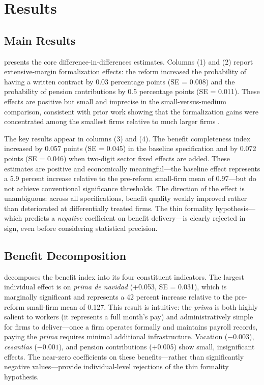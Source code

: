 \documentclass[12pt]{article}
\begin{document}
\section{Results}
\label{sec:results}

\subsection{Main Results}

 presents the core difference-in-differences estimates. Columns (1) and (2) report extensive-margin formalization effects: the reform increased the probability of having a written contract by 0.03 percentage points (SE = 0.008) and the probability of pension contributions by 0.5 percentage points (SE = 0.011). These effects are positive but small and imprecise in the small-versus-medium comparison, consistent with prior work showing that the formalization gains were concentrated among the smallest firms relative to much larger firms \citep{kugler2017effects}.

The key results appear in columns (3) and (4). The benefit completeness index increased by 0.057 points (SE = 0.045) in the baseline specification and by 0.072 points (SE = 0.046) when two-digit sector fixed effects are added. These estimates are positive and economically meaningful---the baseline effect represents a 5.9 percent increase relative to the pre-reform small-firm mean of 0.97---but do not achieve conventional significance thresholds. The direction of the effect is unambiguous: across all specifications, benefit quality weakly improved rather than deteriorated at differentially treated firms. The thin formality hypothesis---which predicts a \textit{negative} coefficient on benefit delivery---is clearly rejected in sign, even before considering statistical precision.



\subsection{Benefit Decomposition}

 decomposes the benefit index into its four constituent indicators. The largest individual effect is on \textit{prima de navidad} (+0.053, SE = 0.031), which is marginally significant and represents a 42 percent increase relative to the pre-reform small-firm mean of 0.127. This result is intuitive: the \textit{prima} is both highly salient to workers (it represents a full month's pay) and administratively simple for firms to deliver---once a firm operates formally and maintains payroll records, paying the \textit{prima} requires minimal additional infrastructure. Vacation ($-0.003$), \textit{cesant\'{\i}as} ($-0.001$), and pension contributions (+0.005) show small, insignificant effects. The near-zero coefficients on these benefits---rather than significantly negative values---provide individual-level rejections of the thin formality hypothesis.
\end{document}
